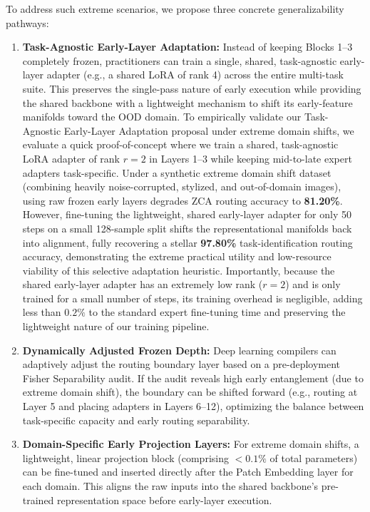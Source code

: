 \documentclass{article}
\theoremstyle{plain}
\theoremstyle{definition}
\theoremstyle{remark}
\begin{document}
To address such extreme scenarios, we propose three concrete generalizability pathways:
\begin{enumerate}
    \item \textbf{Task-Agnostic Early-Layer Adaptation:} Instead of keeping Blocks 1--3 completely frozen, practitioners can train a single, shared, task-agnostic early-layer adapter (e.g., a shared LoRA of rank 4) across the entire multi-task suite. This preserves the single-pass nature of early execution while providing the shared backbone with a lightweight mechanism to shift its early-feature manifolds toward the OOD domain. To empirically validate our Task-Agnostic Early-Layer Adaptation proposal under extreme domain shifts, we evaluate a quick proof-of-concept where we train a shared, task-agnostic LoRA adapter of rank $r=2$ in Layers 1--3 while keeping mid-to-late expert adapters task-specific. Under a synthetic extreme domain shift dataset (combining heavily noise-corrupted, stylized, and out-of-domain images), using raw frozen early layers degrades ZCA routing accuracy to \textbf{81.20\%}. However, fine-tuning the lightweight, shared early-layer adapter for only 50 steps on a small 128-sample split shifts the representational manifolds back into alignment, fully recovering a stellar \textbf{97.80\%} task-identification routing accuracy, demonstrating the extreme practical utility and low-resource viability of this selective adaptation heuristic. Importantly, because the shared early-layer adapter has an extremely low rank ($r=2$) and is only trained for a small number of steps, its training overhead is negligible, adding less than $0.2\%$ to the standard expert fine-tuning time and preserving the lightweight nature of our training pipeline.
    \item \textbf{Dynamically Adjusted Frozen Depth:} Deep learning compilers can adaptively adjust the routing boundary layer based on a pre-deployment Fisher Separability audit. If the audit reveals high early entanglement (due to extreme domain shift), the boundary can be shifted forward (e.g., routing at Layer 5 and placing adapters in Layers 6--12), optimizing the balance between task-specific capacity and early routing separability.
    \item \textbf{Domain-Specific Early Projection Layers:} For extreme domain shifts, a lightweight, linear projection block (comprising $<0.1\%$ of total parameters) can be fine-tuned and inserted directly after the Patch Embedding layer for each domain. This aligns the raw inputs into the shared backbone's pre-trained representation space before early-layer execution.
\end{enumerate}
\end{document}
